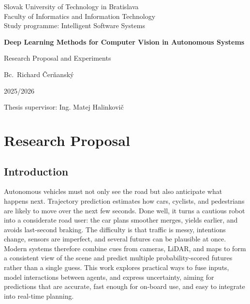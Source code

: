 \documentclass[12pt,a4paper]{report}
\begin{document}
\begin{titlepage}
\centering
\begin{center}
Slovak University of Technology in Bratislava\\
Faculty of Informatics and Information Technology\\
Study programme: Intelligent Software Systems
\end{center}
\noindent\hrulefill

\vspace*{5cm}

{\LARGE\bfseries Deep Learning Methods for Computer Vision in Autonomous Systems\par}
\vspace{0.6cm}
{\large Research Proposal and Experiments\par}

\vspace{2.2cm}
{\large Bc.\ Richard Čerňanský\par}
{\large 2025/2026\par}

\vfill
\begin{flushleft}
Thesis supervisor: Ing. Matej Halinkovič
\end{flushleft}
\end{titlepage}

\onehalfspacing

\tableofcontents
\clearpage

\chapter{Research Proposal}

\section{Introduction}
\quad Autonomous vehicles must not only see the road but also anticipate what happens next. Trajectory prediction estimates how cars, cyclists, and pedestrians are likely to move over the next few seconds. Done well, it turns a cautious robot into a considerate road user: the car plans smoother merges, yields earlier, and avoids last-second braking. The difficulty is that traffic is messy, intentions change, sensors are imperfect, and several futures can be plausible at once. Modern systems therefore combine cues from cameras, LiDAR, and maps to form a consistent view of the scene and predict multiple probability-scored futures rather than a single guess. This work explores practical ways to fuse inputs, model interactions between agents, and express uncertainty, aiming for predictions that are accurate, fast enough for on-board use, and easy to integrate into real-time planning.
\end{document}
